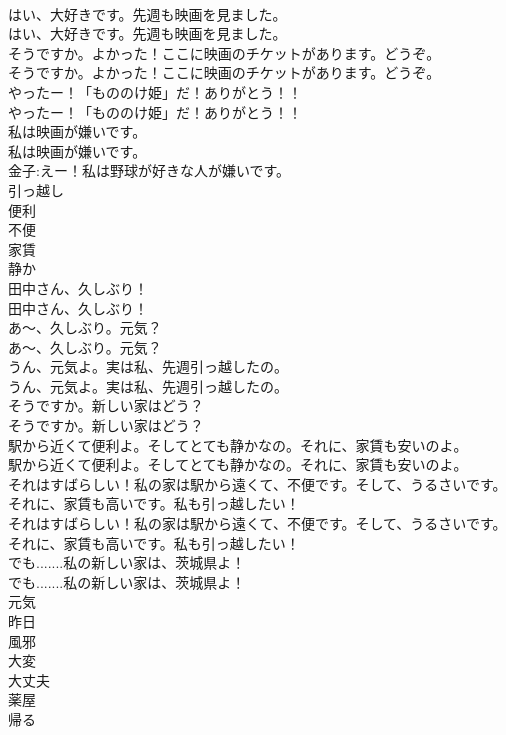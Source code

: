 \documentclass[8pt]{extreport}
\begin{document}
\begin{CJK}{UTF8}{min}
\\	はい、大好きです。先週も映画を見ました。	
\\	はい、大好きです。先週も映画を見ました。 
\\	そうですか。よかった！ここに映画のチケットがあります。どうぞ。	
\\	そうですか。よかった！ここに映画のチケットがあります。どうぞ。 
\\	やったー！「もののけ姫」だ！ありがとう！！	
\\	やったー！「もののけ姫」だ！ありがとう！！ 
\\	私は映画が嫌いです。	
\\	私は映画が嫌いです。 
\\	金子:えー！私は野球が好きな人が嫌いです。	
\\	引っ越し
\\	便利
\\	不便
\\	家賃
\\	静か
\\	田中さん、久しぶり！	
\\	田中さん、久しぶり！ 
\\	あ〜、久しぶり。元気？	
\\	あ〜、久しぶり。元気？ 
\\	うん、元気よ。実は私、先週引っ越したの。	
\\	うん、元気よ。実は私、先週引っ越したの。 
\\	そうですか。新しい家はどう？	
\\	そうですか。新しい家はどう？ 
\\	駅から近くて便利よ。そしてとても静かなの。それに、家賃も安いのよ。	
\\	駅から近くて便利よ。そしてとても静かなの。それに、家賃も安いのよ。 
\\	それはすばらしい！私の家は駅から遠くて、不便です。そして、うるさいです。それに、家賃も高いです。私も引っ越したい！	
\\	それはすばらしい！私の家は駅から遠くて、不便です。そして、うるさいです。それに、家賃も高いです。私も引っ越したい！ 
\\	でも.......私の新しい家は、茨城県よ！	
\\	でも.......私の新しい家は、茨城県よ！ 
\\	元気
\\	昨日
\\	風邪
\\	大変
\\	大丈夫
\\	薬屋
\\	帰る

\end{CJK}
\end{document}
